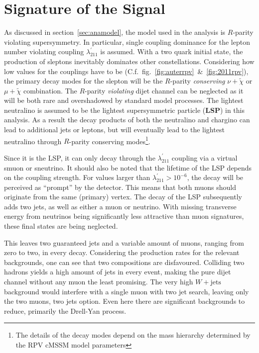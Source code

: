 \chapter{Signature of the Signal}
\label{cha:sig}

As discussed in section~\ref{sec:anamodel}, the model used in the analysis is $R$-parity violating supersymmetry. In particular, single coupling dominance for the lepton number violating coupling $\lambda^\prime_{211}$ is assumed. With a two quark initial state, the production of sleptons inevitably dominates other constellations. Considering how low values for the couplings have to be (C.f.~fig.~\ref{fig:auterrpv}~\&~\ref{fig:2011rpv}), the primary decay modes for the slepton will be the $R$-parity \textit{conserving} $\nu + \tilde{\chi}$ or $\mu + \tilde{\chi}$ combination. The $R$-parity \textit{violating} dijet channel can be neglected as it will be both rare and overshadowed by standard model processes. The lightest neutralino is assumed to be the lightest supersymmetric particle (\textbf{LSP}) in this analysis. As a result the decay products of both the neutralino and chargino can lead to additional jets or leptons, but will eventually lead to the lightest neutralino through $R$-parity conserving modes\footnote{The details of the decay modes depend on the mass hierarchy determined by the RPV cMSSM model parameters}. 


Since it is the LSP, it can only decay through the $\lambda^\prime_{211}$ coupling via a virtual smuon or sneutrino. It should also be noted that the lifetime of the LSP depends on the coupling strength. For values larger than $\lambda^\prime_{211} > 10^{-6}$, the decay will be perceived as ``prompt'' by the detector. This means that both muons should originate from the same (primary) vertex. The decay of the LSP subsequently adds two jets, as well as either a muon or neutrino. With missing transverse energy from neutrinos being significantly less attractive than muon signatures, these final states are being neglected. 


This leaves two guaranteed jets and a variable amount of muons, ranging from zero to two, in every decay. Considering the production rates for the relevant backgrounds, one can see that two compositions are disfavoured. Colliding two hadrons yields a high amount of jets in every event, making the pure dijet channel without any muon the least promising. The very high $W + \text{jets}$ background would interfere with a single muon with two jet search, leaving only the two muons, two jets option. Even here there are significant backgrounds to reduce, primarily the Drell-Yan process.

